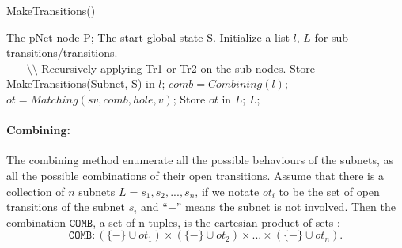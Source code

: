 \documentclass{lncs/llncs}
\begin{document}
\begin{algorithm}
\caption{MakeTransitions()}
  \label{alg2}
\begin{algorithmic}[1]
\Require The pNet node P; The start global state S.
\State Initialize a list $l$, $L$ for sub-transitions/transitions.
	\\ ~~~ $\setminus \setminus$ Recursively applying Tr1 or Tr2 on the sub-nodes.
                \State Store MakeTransitions(Subnet, S) in $l$;
	\EndFor
		\State $comb = Combining(l)$;
                 \State $ot = Matching(sv, comb, hole, v)$;
                 \State Store $ot$ in $L$; 
	\EndFor
\State \Return $L$;
\end{algorithmic}  
\end{algorithm}



%
%


\def\inactive{\{-\}}
\paragraph{Combining:}
The combining method enumerate all the possible behaviours of the
subnets, as all the possible combinations of their open transitions.
Assume that there is a collection of $n$ subnets $L = {s_1, s_2, ...,
  s_n}$, if we notate $ot_i$ to be the set of open transitions of the
subnet $s_i$ and ``$-$'' means the subnet is not involved.  
Then the combination $\texttt{COMB}$, a set of n-tuples, is the
cartesian product of sets :  
\[\texttt{COMB} : (\inactive\cup ot_1) \times (\inactive\cup ot_2)\times ... \times (\inactive\cup ot_n) .\]

\end{document}
